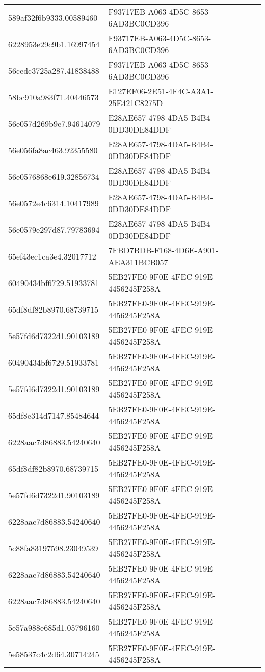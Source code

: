\begin{tabular}{ll}
589af32f6b9333.00589460 & F93717EB-A063-4D5C-8653-6AD3BC0CD396 \\
6228953e29c9b1.16997454 & F93717EB-A063-4D5C-8653-6AD3BC0CD396 \\
56cedc3725a287.41838488 & F93717EB-A063-4D5C-8653-6AD3BC0CD396 \\
58bc910a983f71.40446573 & E127EF06-2E51-4F4C-A3A1-25E421C8275D \\
56e057d269b9e7.94614079 & E28AE657-4798-4DA5-B4B4-0DD30DE84DDF \\
56e056fa8ac463.92355580 & E28AE657-4798-4DA5-B4B4-0DD30DE84DDF \\
56e0576868e619.32856734 & E28AE657-4798-4DA5-B4B4-0DD30DE84DDF \\
56e0572e4c6314.10417989 & E28AE657-4798-4DA5-B4B4-0DD30DE84DDF \\
56e0579e297d87.79783694 & E28AE657-4798-4DA5-B4B4-0DD30DE84DDF \\
65ef43ec1ca3e4.32017712 & 7FBD7BDB-F168-4D6E-A901-AEA311BCB057 \\
60490434bf6729.51933781 & 5EB27FE0-9F0E-4FEC-919E-4456245F258A \\
65df8df82b8970.68739715 & 5EB27FE0-9F0E-4FEC-919E-4456245F258A \\
5e57fd6d7322d1.90103189 & 5EB27FE0-9F0E-4FEC-919E-4456245F258A \\
60490434bf6729.51933781 & 5EB27FE0-9F0E-4FEC-919E-4456245F258A \\
5e57fd6d7322d1.90103189 & 5EB27FE0-9F0E-4FEC-919E-4456245F258A \\
65df8e314d7147.85484644 & 5EB27FE0-9F0E-4FEC-919E-4456245F258A \\
6228aac7d86883.54240640 & 5EB27FE0-9F0E-4FEC-919E-4456245F258A \\
65df8df82b8970.68739715 & 5EB27FE0-9F0E-4FEC-919E-4456245F258A \\
5e57fd6d7322d1.90103189 & 5EB27FE0-9F0E-4FEC-919E-4456245F258A \\
6228aac7d86883.54240640 & 5EB27FE0-9F0E-4FEC-919E-4456245F258A \\
5c88fa83197598.23049539 & 5EB27FE0-9F0E-4FEC-919E-4456245F258A \\
6228aac7d86883.54240640 & 5EB27FE0-9F0E-4FEC-919E-4456245F258A \\
6228aac7d86883.54240640 & 5EB27FE0-9F0E-4FEC-919E-4456245F258A \\
5e57a988e685d1.05796160 & 5EB27FE0-9F0E-4FEC-919E-4456245F258A \\
5e58537c4c2d64.30714245 & 5EB27FE0-9F0E-4FEC-919E-4456245F258A \\

\end{tabular}
